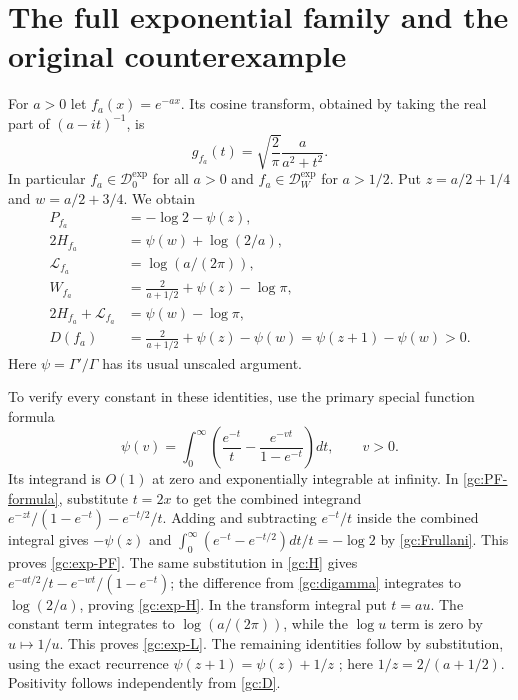 \documentclass[11pt]{article}
\begin{document}
\section{The full exponential family and the original counterexample}

For $a>0$ let $f_a(x)=e^{-ax}$.  Its cosine transform, obtained by taking
the real part of $(a-it)^{-1}$, is
\begin{equation}
 g_{f_a}(t)=\sqrt{\frac2\pi}\frac{a}{a^2+t^2}.
 \label{gc:exponential-transform}
\end{equation}
In particular $f_a\in\mathcal D_0^{\exp}$ for all $a>0$ and
$f_a\in\mathcal D_W^{\exp}$ for $a>1/2$.
Put $z=a/2+1/4$ and $w=a/2+3/4$.  We obtain
\begin{align}
 P_{f_a}&=-\log2-\psi(z),\label{gc:exp-PF}\\
 2H_{f_a}&=\psi(w)+\log(2/a),\label{gc:exp-H}\\
 \mathscr L_{f_a}&=\log(a/(2\pi)),\label{gc:exp-L}\\
 W_{f_a}&=\frac{2}{a+1/2}+\psi(z)-\log\pi,
 \label{gc:exp-W}\\
 2H_{f_a}+\mathscr L_{f_a}&=\psi(w)-\log\pi,
 \label{gc:exp-right}\\
 D(f_a)&=\frac{2}{a+1/2}+\psi(z)-\psi(w)
       =\psi(z+1)-\psi(w)>0.
 \label{gc:exp-D}
\end{align}
Here $\psi=\Gamma'/\Gamma$ has its usual unscaled argument.

To verify every constant in these identities, use the primary special
function formula \cite[5.9.12]{dlmf}
\begin{equation}
 \psi(v)=\int_0^\infty
 \left(\frac{e^{-t}}t-\frac{e^{-vt}}{1-e^{-t}}\right)dt,
 \qquad v>0.
 \label{gc:digamma}
\end{equation}
Its integrand is $O(1)$ at zero and exponentially integrable at infinity.
In \eqref{gc:PF-formula}, substitute $t=2x$ to get the combined
integrand $e^{-zt}/(1-e^{-t})-e^{-t/2}/t$.
Adding and subtracting $e^{-t}/t$ inside the combined integral gives
$-\psi(z)$ and
$\int_0^\infty(e^{-t}-e^{-t/2})dt/t=-\log2$ by
\eqref{gc:Frullani}.  This proves \eqref{gc:exp-PF}.
The same substitution in \eqref{gc:H} gives
$e^{-at/2}/t-e^{-wt}/(1-e^{-t})$; the difference from
\eqref{gc:digamma} integrates to $\log(2/a)$, proving
\eqref{gc:exp-H}.
In the transform integral put $t=au$.  The constant term integrates to
$\log(a/(2\pi))$, while the $\log u$ term is zero by $u\mapsto1/u$.
This proves \eqref{gc:exp-L}.  The remaining identities follow by
substitution, using the exact recurrence
$\psi(z+1)=\psi(z)+1/z$ \cite[5.5.2]{dlmf}; here
$1/z=2/(a+1/2)$.  Positivity follows independently from \eqref{gc:D}.
\end{document}
